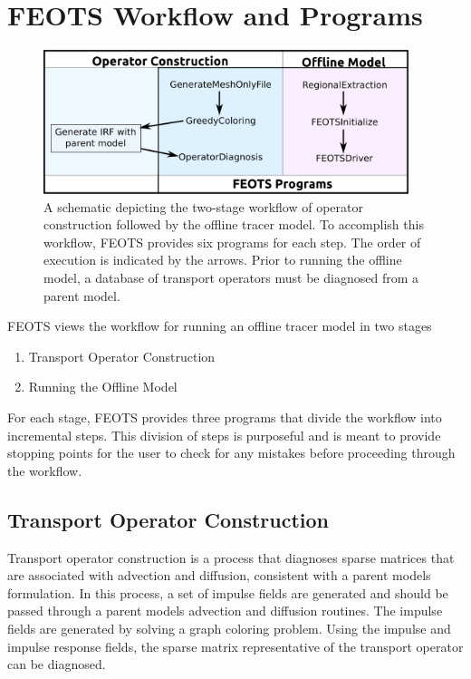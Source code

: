 \documentclass{softwaremanual}
\begin{document}
\chapter{FEOTS Workflow and Programs}
\begin{figure}[h!]
\begin{center}
\includegraphics[width=0.95\textwidth]{workflow.eps}
\caption{A schematic depicting the two-stage workflow of operator construction followed by the offline tracer model. To accomplish this workflow, FEOTS provides six programs for each step. The order of execution is indicated by the arrows. Prior to running the offline model, a database of transport operators must be diagnosed from a parent model. }\label{fig:workflow}
\end{center}
\end{figure}


FEOTS views the workflow for running an offline tracer model in two stages 
\begin{enumerate}
\item Transport Operator Construction

\item Running the Offline Model
\end{enumerate}

For each stage, FEOTS provides three programs that divide the workflow into incremental steps. This division of steps is purposeful and is meant to provide stopping points for the user to check for any mistakes before proceeding through the workflow.

\section{Transport Operator Construction}

Transport operator construction is a process that diagnoses sparse matrices that are associated with advection and diffusion, consistent with a parent models formulation. In this process, a set of impulse fields are generated and should be passed through a parent models advection and diffusion routines. The impulse fields are generated by solving a graph coloring problem.  Using the impulse and impulse response fields, the sparse matrix representative of the transport operator can be diagnosed.
\end{document}
